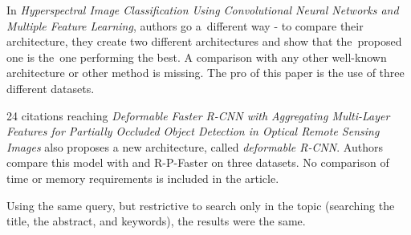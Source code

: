 In \textit{Hyperspectral Image Classification Using Convolutional Neural Networks and Multiple Feature Learning}, authors go a~different way - to compare their architecture, they create two different architectures and show that the~proposed one is the~one performing the best. A comparison with any other well-known architecture or other  method is missing. The pro of this paper is the use of three different datasets.

24 citations reaching \textit{Deformable Faster R-CNN with Aggregating Multi-Layer Features for Partially Occluded Object Detection in Optical Remote Sensing Images} also proposes a new architecture, called \textit{deformable R-CNN}. Authors compare this model with  and R-P-Faster  \cite{rp-faster-rcnn} on three datasets. No comparison of time or memory requirements is included in the article.

Using the same query, but restrictive to search only in the topic (searching the title, the abstract, and keywords), the results were the same.







